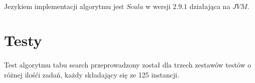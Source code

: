 \documentclass[wide,a4paper,titlepage,12pt] {article}
\begin{document}
\paragraph{}
Jezykiem implementacji algorytmu jest $Scala$ w wersji $2.9.1$ działająca na $JVM$.
\paragraph{}
\lstset{ %
    language=java,                %
    basicstyle=\scriptsize,       %
    numbers=left,                   %
    numberstyle=\scriptsize,      %
    stepnumber=10,                   %
    numbersep=9pt,                  %
    showspaces=false,               %
    showstringspaces=false,         %
    showtabs=false,                 %
    breaklines=true,                %
    }
    
\newpage
\section{Testy}
\paragraph{}
Test algorytmu tabu search przeprowadzony został dla trzech zestawów testów o różnej ilośći zadań, każdy składający się ze 125 instancji. 
\end{document}
